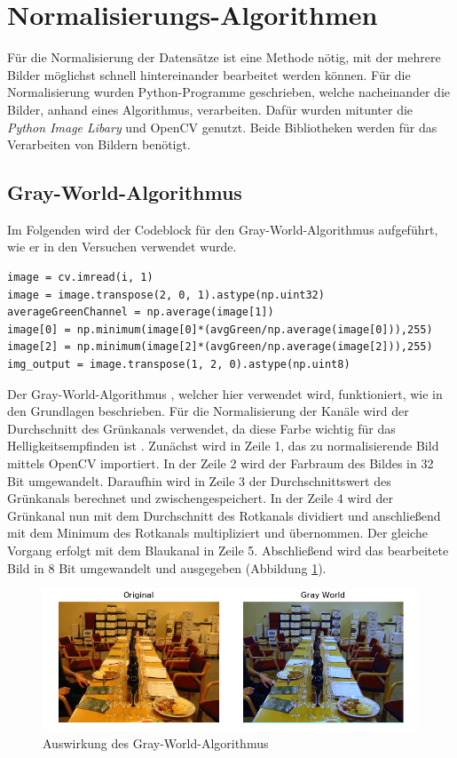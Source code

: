 \section{Normalisierungs-Algorithmen}\label{s.nalgorithmen}
Für die Normalisierung der Datensätze ist eine Methode nötig, mit der mehrere Bilder möglichst schnell hintereinander bearbeitet werden können. Für die Normalisierung wurden Python-Programme geschrieben, welche nacheinander die Bilder, anhand eines Algorithmus, verarbeiten. Dafür wurden mitunter die \textit{Python Image Libary} und OpenCV genutzt. Beide Bibliotheken werden für das Verarbeiten von Bildern benötigt. 
\newpage
\subsection{Gray-World-Algorithmus} 
Im Folgenden wird der Codeblock für den Gray-World-Algorithmus aufgeführt, wie er in den Versuchen verwendet wurde.\\
\begin{lstlisting}
image = cv.imread(i, 1)
image = image.transpose(2, 0, 1).astype(np.uint32)
averageGreenChannel = np.average(image[1])
image[0] = np.minimum(image[0]*(avgGreen/np.average(image[0])),255)
image[2] = np.minimum(image[2]*(avgGreen/np.average(image[2])),255)
img_output = image.transpose(1, 2, 0).astype(np.uint8)
\end{lstlisting}
Der Gray-World-Algorithmus \cite{gray2012world}, welcher hier verwendet wird, funktioniert, wie in den Grundlagen beschrieben. Für die Normalisierung der Kanäle wird der Durchschnitt des Grünkanals verwendet, da diese Farbe wichtig für das Helligkeitsempfinden ist \cite{farbmodell2019uni}. Zunächst wird in Zeile 1, das zu normalisierende Bild mittels OpenCV importiert. In der Zeile 2 wird der Farbraum des Bildes in 32 Bit umgewandelt. Daraufhin wird in Zeile 3 der Durchschnittswert des Grünkanals berechnet und zwischengespeichert. In der Zeile 4 wird der Grünkanal nun mit dem Durchschnitt des Rotkanals dividiert und anschließend mit dem Minimum des Rotkanals multipliziert und übernommen. Der gleiche Vorgang erfolgt mit dem Blaukanal in Zeile 5. Abschließend wird das bearbeitete Bild in 8 Bit umgewandelt und ausgegeben (Abbildung \ref{img:gwnimg}). 
\begin{figure}
	[h]
	\centering
	\includegraphics[scale=0.6]{Sources/gwn.png}
	\caption{Auswirkung des Gray-World-Algorithmus}
	\label{img:gwnimg}
\end{figure}
\newpage
